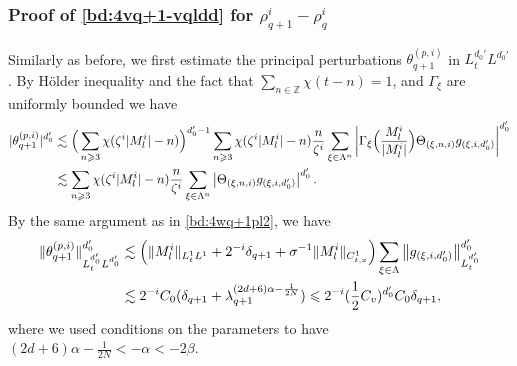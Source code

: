 \documentclass[10pt,a4paper]{amsart}
\numberwithin{equation}{section}
\def\({{\Big(}}
\def\){{\Big)}}
\newcommand{\norm}[1]{\left\|#1\right\|}
\def\geq{\geqslant}
\def\leq{\leqslant}
\def\({{\Big(}}
\def\){{\Big)}}
\def\geq{\geqslant}
\def\leq{\leqslant}
\begin{document}
\subsubsection{Proof of  \eqref{bd:4vq+1-vqldd} for $\rho^{i}_{q+1}-\rho_q^i$}\label{sec:4esttheq+1}
Similarly as before, we first estimate the principal perturbations  $\theta^{(p,i)}_{q+1}$ in $L^{d_0'}_tL^{d_0'}$.  By H\"older inequality and the fact that  $\sum_{n\in\mathbb{Z}} {\chi}(t - n) =1$, and $\Gamma_{\xi}$ are uniformly bounded we have
\begin{align}
|\theta_{q+1}^{(p,i)}|^{d_0'}
&\lesssim\(\sum_{n\geq3}\chi(\zeta^{i}|M^{i}_l|-n)\)^{d_0'-1}\sum_{n\geq3}\chi(\zeta^{i}|M^{i}_l|-n)\frac{n}{\zeta^{i}}\sum_{\xi\in\Lambda^{n}}\left|\Gamma_{\xi}\(\frac{M^{i}_l}{|M^{i}_l|}\)\Theta_{(\xi,n,i)}g_{(\xi,i,d_0')}\right|^{d_0'}\notag\\
&\lesssim \sum_{n\geq3}\chi(\zeta^{i}|M^{i}_l|-n)\frac{n}{\zeta^{i}}\sum_{\xi\in\Lambda^{n}}\left|\Theta_{(\xi,n,i)}g_{(\xi,i,d_0')}\right|^{d_0'}.\notag
\end{align} 
By the same argument as in \eqref{bd:4wq+1pl2}, we have 
\begin{align}
    \|\theta_{q+1}^{(p,i)}\|_{L^{d_0'}_tL^{d_0'}}^{d_0'}&\lesssim \(\|M^{i}_l\|_{L^1_tL^1}+2^{-i}\delta_{q+1}+\sigma^{-1}\|M^{i}_l\|_{C_{t,x}^1}\)
    \sum_{\xi\in\Lambda }\norm{g_{(\xi,i,d_0')}}^{d_0'}_{L_t^{d_0'}}
    \notag\\
    &\lesssim 2^{-i}C_0(\delta_{q+1}+\lambda_{q+1}^{(2d+6)\alpha-\frac{1}{2N}})\leq 2^{-i}(\frac12C_v)^{d_0'}C_0\delta_{q+1},\label{bd:4theq+1pl2}
\end{align}
where we used  conditions on the parameters to have $(2d+6)\alpha-\frac{1}{2N}<-\alpha<-2\beta$.
\end{document}
